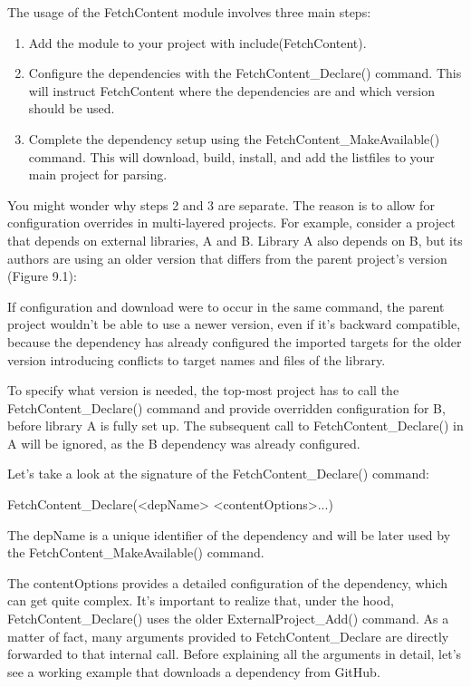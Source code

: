 The usage of the FetchContent module involves three main steps:

\begin{enumerate}
\item
Add the module to your project with include(FetchContent).

\item
Configure the dependencies with the FetchContent\_Declare() command. This will instruct FetchContent where the dependencies are and which version should be used.

\item
Complete the dependency setup using the FetchContent\_MakeAvailable() command. This will download, build, install, and add the listfiles to your main project for parsing.
\end{enumerate}

You might wonder why steps 2 and 3 are separate. The reason is to allow for configuration overrides in multi-layered projects. For example, consider a project that depends on external libraries, A and B. Library A also depends on B, but its authors are using an older version that differs from the parent project’s version (Figure 9.1):


If configuration and download were to occur in the same command, the parent project wouldn’t be able to use a newer version, even if it’s backward compatible, because the dependency has already configured the imported targets for the older version introducing conflicts to target names and files of the library.

To specify what version is needed, the top-most project has to call the FetchContent\_Declare() command and provide overridden configuration for B, before library A is fully set up. The subsequent call to FetchContent\_Declare() in A will be ignored, as the B dependency was already configured.

Let’s take a look at the signature of the FetchContent\_Declare() command:

\begin{shell}
FetchContent_Declare(<depName> <contentOptions>...)
\end{shell}

The depName is a unique identifier of the dependency and will be later used by the FetchContent\_MakeAvailable() command.

The contentOptions provides a detailed configuration of the dependency, which can get quite complex. It’s important to realize that, under the hood, FetchContent\_Declare() uses the older ExternalProject\_Add() command. As a matter of fact, many arguments provided to FetchContent\_Declare are directly forwarded to that internal call. Before explaining all the arguments in detail, let’s see a working example that downloads a dependency from GitHub.


